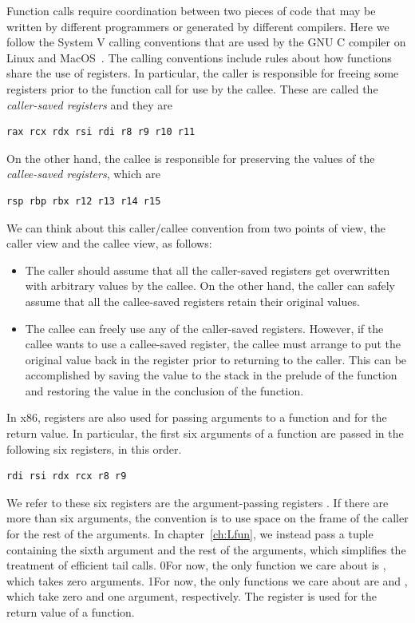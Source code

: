 \documentclass[7x10]{TimesAPriori_MIT}%
\def\racketEd{0}
\def\pythonEd{1}
\def\edition{1}
\newcommand{\racket}[1]{{\if\edition\racketEd{#1}\fi}}
\newcommand{\pythonColor}[0]{}
\newcommand{\python}[1]{{\if\edition\pythonEd\pythonColor #1\fi}}
\numberwithin{theorem}{chapter}
\numberwithin{definition}{chapter}
\numberwithin{equation}{chapter}
\begin{document}
Function calls require coordination between two pieces of code that
may be written by different programmers or generated by different
compilers. Here we follow the System V calling conventions that are
used by the GNU C compiler on Linux and
MacOS~\citep{Bryant:2005aa,Matz:2013aa}.
%
The calling conventions include rules about how functions share the
use of registers. In particular, the caller is responsible for freeing
some registers prior to the function call for use by the callee.
These are called the \emph{caller-saved registers}
and they are
\begin{lstlisting}
rax rcx rdx rsi rdi r8 r9 r10 r11
\end{lstlisting}
On the other hand, the callee is responsible for preserving the values
of the \emph{callee-saved registers}, 
which are
\begin{lstlisting}
rsp rbp rbx r12 r13 r14 r15
\end{lstlisting}

We can think about this caller/callee convention from two points of
view, the caller view and the callee view, as follows:
\begin{itemize}
\item The caller should assume that all the caller-saved registers get
  overwritten with arbitrary values by the callee.  On the other hand,
  the caller can safely assume that all the callee-saved registers
  retain their original values.
\item The callee can freely use any of the caller-saved registers.
  However, if the callee wants to use a callee-saved register, the
  callee must arrange to put the original value back in the register
  prior to returning to the caller. This can be accomplished by saving
  the value to the stack in the prelude of the function and restoring
  the value in the conclusion of the function.
\end{itemize}

In x86, registers are also used for passing arguments to a function
and for the return value.  In particular, the first six arguments of a
function are passed in the following six registers, in this order.
\begin{lstlisting}
rdi rsi rdx rcx r8 r9
\end{lstlisting}
We refer to these six registers are the argument-passing registers
.
If there are more than six arguments, the convention is to use space
on the frame of the caller for the rest of the arguments. In
chapter~\ref{ch:Lfun}, we instead pass a tuple containing the sixth
argument and the rest of the arguments, which simplifies the treatment
of efficient tail calls.
%
\racket{For now, the only function we care about is ,
  which takes zero arguments.}
%
\python{For now, the only functions we care about are \code{read\_int}
  and \code{print\_int}, which take zero and one argument, respectively.}
%
The register  is used for the return value of a function.
\end{document}
